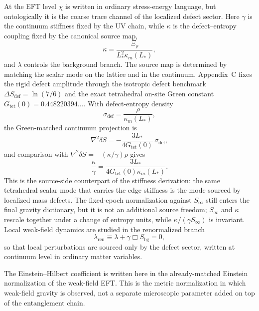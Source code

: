\documentclass[11pt]{article}
\begin{document}
At the EFT level $\chi$ is written in ordinary stress-energy language, but ontologically it is the coarse trace channel of the localized defect sector. Here $\gamma$ is the continuum stiffness fixed by the UV chain, while $\kappa$ is the defect--entropy coupling fixed by the canonical source map,
\[
\kappa=\frac{\Xi_\rho}{L_*^2\kappa_m(L_*)},
\]
and $\lambda$ controls the background branch. The source map is determined by matching the scalar mode on the lattice and in the continuum. Appendix~C fixes the rigid defect amplitude through the isotropic defect benchmark $\Delta S_{\mathrm{def}}=\ln(7/6)$ and the exact tetrahedral on-site Green constant $G_{\mathrm{tet}}(0)=0.448220394\ldots$. With defect-entropy density
\[
\sigma_{\mathrm{def}}=\frac{\rho}{\kappa_m(L_*)},
\]
the Green-matched continuum projection is
\[
\nabla^2\delta S
=
-\frac{3L_*}{4G_{\mathrm{tet}}(0)}\,\sigma_{\mathrm{def}},
\]
and comparison with $\nabla^2\delta S=-(\kappa/\gamma)\rho$ gives
\[
\frac{\kappa}{\gamma}
=
\frac{3L_*}{4G_{\mathrm{tet}}(0)\kappa_m(L_*)}.
\]
This is the source-side counterpart of the stiffness derivation: the same tetrahedral scalar mode that carries the edge stiffness is the mode sourced by localized mass defects. The fixed-epoch normalization against $S_\infty$ still enters the final gravity dictionary, but it is not an additional source freedom; $S_\infty$ and $\kappa$ rescale together under a change of entropy units, while $\kappa/(\gamma S_\infty)$ is invariant. Local weak-field dynamics are studied in the renormalized branch
\[
\lambda_{\mathrm{ren}}\equiv \lambda+\gamma\Box S_{\mathrm{bg}}=0,
\]
so that local perturbations are sourced only by the defect sector, written at continuum level in ordinary matter variables.

The Einstein--Hilbert coefficient is written here in the already-matched Einstein normalization of the weak-field EFT. This is the metric normalization in which weak-field gravity is observed, not a separate microscopic parameter added on top of the entanglement chain.
\end{document}

